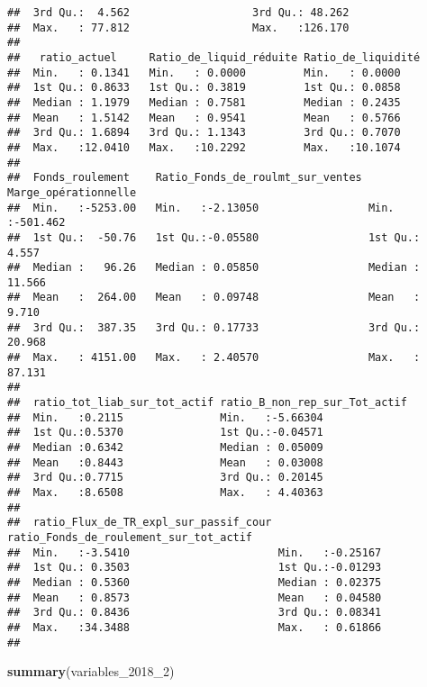 \documentclass[
]{article}
\newenvironment{Shaded}{\begin{snugshade}}{\end{snugshade}}
\newcommand{\DecValTok}[1]{\textcolor[rgb]{0.00,0.00,0.81}{#1}}
\newcommand{\KeywordTok}[1]{\textcolor[rgb]{0.13,0.29,0.53}{\textbf{#1}}}
\newcommand{\NormalTok}[1]{#1}
\begin{document}
\begin{verbatim}
##  3rd Qu.:  4.562                   3rd Qu.: 48.262              
##  Max.   : 77.812                   Max.   :126.170              
##                                                                 
##   ratio_actuel     Ratio_de_liquid_réduite Ratio_de_liquidité
##  Min.   : 0.1341   Min.   : 0.0000         Min.   : 0.0000   
##  1st Qu.: 0.8633   1st Qu.: 0.3819         1st Qu.: 0.0858   
##  Median : 1.1979   Median : 0.7581         Median : 0.2435   
##  Mean   : 1.5142   Mean   : 0.9541         Mean   : 0.5766   
##  3rd Qu.: 1.6894   3rd Qu.: 1.1343         3rd Qu.: 0.7070   
##  Max.   :12.0410   Max.   :10.2292         Max.   :10.1074   
##                                                              
##  Fonds_roulement    Ratio_Fonds_de_roulmt_sur_ventes Marge_opérationnelle
##  Min.   :-5253.00   Min.   :-2.13050                 Min.   :-501.462    
##  1st Qu.:  -50.76   1st Qu.:-0.05580                 1st Qu.:   4.557    
##  Median :   96.26   Median : 0.05850                 Median :  11.566    
##  Mean   :  264.00   Mean   : 0.09748                 Mean   :   9.710    
##  3rd Qu.:  387.35   3rd Qu.: 0.17733                 3rd Qu.:  20.968    
##  Max.   : 4151.00   Max.   : 2.40570                 Max.   :  87.131    
##                                                                          
##  ratio_tot_liab_sur_tot_actif ratio_B_non_rep_sur_Tot_actif
##  Min.   :0.2115               Min.   :-5.66304             
##  1st Qu.:0.5370               1st Qu.:-0.04571             
##  Median :0.6342               Median : 0.05009             
##  Mean   :0.8443               Mean   : 0.03008             
##  3rd Qu.:0.7715               3rd Qu.: 0.20145             
##  Max.   :8.6508               Max.   : 4.40363             
##                                                            
##  ratio_Flux_de_TR_expl_sur_passif_cour ratio_Fonds_de_roulement_sur_tot_actif
##  Min.   :-3.5410                       Min.   :-0.25167                      
##  1st Qu.: 0.3503                       1st Qu.:-0.01293                      
##  Median : 0.5360                       Median : 0.02375                      
##  Mean   : 0.8573                       Mean   : 0.04580                      
##  3rd Qu.: 0.8436                       3rd Qu.: 0.08341                      
##  Max.   :34.3488                       Max.   : 0.61866                      
## 
\end{verbatim}

\begin{Shaded}
\begin{Highlighting}[]
\KeywordTok{summary}\NormalTok{(variables_}\DecValTok{2018}\NormalTok{_}\DecValTok{2}\NormalTok{)}
\end{Highlighting}
\end{Shaded}
\end{document}
